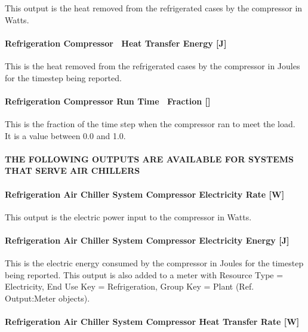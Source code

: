 This output is the heat removed from the refrigerated cases by the compressor in Watts.

\paragraph{Refrigeration Compressor~ Heat Transfer Energy {[}J{]}}\label{refrigeration-compressor-heat-transfer-energy-j}

This is the heat removed from the refrigerated cases by the compressor in Joules for the timestep being reported.

\paragraph{Refrigeration Compressor Run Time~ Fraction {[]}}\label{refrigeration-compressor-run-time-fraction}

This is the fraction of the time step when the compressor ran to meet the load.~ It is a value between 0.0 and 1.0.

\paragraph{THE FOLLOWING OUTPUTS ARE AVAILABLE FOR SYSTEMS THAT SERVE AIR CHILLERS}\label{the-following-outputs-are-available-for-systems-that-serve-air-chillers-1}

\paragraph{Refrigeration Air Chiller System Compressor Electricity Rate {[}W{]}}\label{refrigeration-air-chiller-system-compressor-electric-power-w}

This output is the electric power input to the compressor in Watts.

\paragraph{Refrigeration Air Chiller System Compressor Electricity Energy {[}J{]}}\label{refrigeration-air-chiller-system-compressor-electric-energy-j}

This is the electric energy consumed by the compressor in Joules for the timestep being reported. This output is also added to a meter with Resource Type = Electricity, End Use Key = Refrigeration, Group Key = Plant (Ref. Output:Meter objects).

\paragraph{Refrigeration Air Chiller System Compressor Heat Transfer Rate {[}W{]}}\label{refrigeration-air-chiller-system-compressor-heat-transfer-rate-w}

